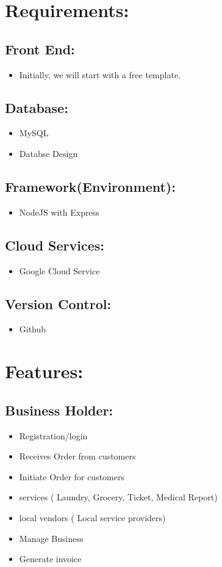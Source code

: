 \documentclass[13pt]{extarticle}
\begin{document}
\section{\textbf{Requirements:}}
\subsection{Front End:}
\begin{itemize}
    \item Initially, we will start with a free template.
\end{itemize}
\subsection{Database:}
\begin{itemize}
    \item MySQL
    \item Databse Design
\end{itemize}
\subsection{Framework(Environment):}
\begin{itemize}
    \item NodeJS with Express
\end{itemize}
\subsection{Cloud Services:}
\begin{itemize}
    \item Google Cloud Service
\end{itemize}
\subsection{Version Control:}
\begin{itemize}
    \item Github
\end{itemize}
\newpage

\section{\textbf{Features:}}
\subsection{Business Holder:}
\begin{itemize}
    \item Registration/login 
\item Receives Order from customers
\item Initiate Order for customers
\item services ( Laundry, Grocery, Ticket, Medical Report)
\item local vendors ( Local service providers)
\item Manage Business
 \item Generate invoice 
\end{itemize}
\end{document}
